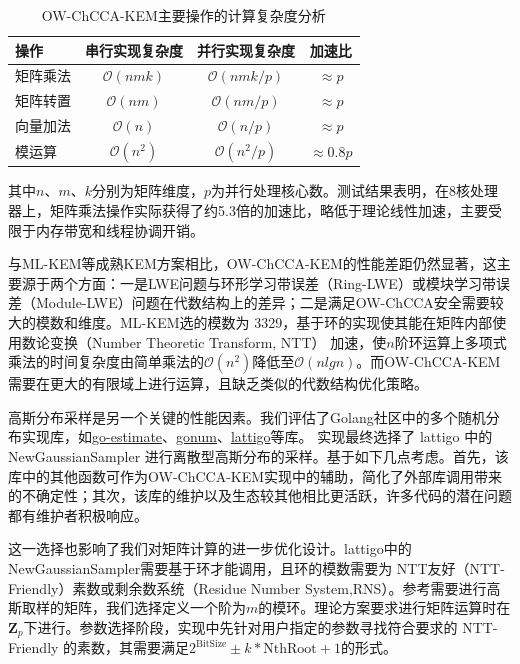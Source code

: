\begin{table}[ht]
\centering
\caption{OW-ChCCA-KEM主要操作的计算复杂度分析}
\label{tab:complexity-analysis}
\begin{tabular}{|l|c|c|c|}
\hline
\textbf{操作} & \textbf{串行实现复杂度} & \textbf{并行实现复杂度} & \textbf{加速比} \\
\hline
矩阵乘法 & $\mathcal{O}(nmk)$ & $\mathcal{O}(nmk/p)$ & $\approx p$ \\
\hline
矩阵转置 & $\mathcal{O}(nm)$ & $\mathcal{O}(nm/p)$ & $\approx p$ \\
\hline
向量加法 & $\mathcal{O}(n)$ & $\mathcal{O}(n/p)$ & $\approx p$ \\
\hline
模运算 & $\mathcal{O}(n^2)$ & $\mathcal{O}(n^2/p)$ & $\approx 0.8p$ \\
\hline
\end{tabular}
\end{table}

其中$n$、$m$、$k$分别为矩阵维度，$p$为并行处理核心数。测试结果表明，在8核处理器上，矩阵乘法操作实际获得了约5.3倍的加速比，略低于理论线性加速，主要受限于内存带宽和线程协调开销。

与ML-KEM等成熟KEM方案相比，OW-ChCCA-KEM的性能差距仍然显著，这主要源于两个方面：一是LWE问题与环形学习带误差（Ring-LWE）或模块学习带误差（Module-LWE）问题在代数结构上的差异；二是满足OW-ChCCA安全需要较大的模数和维度。ML-KEM选的模数为 3329，基于环的实现使其能在矩阵内部使用数论变换（Number Theoretic Transform, NTT） 加速，使$n$阶环运算上多项式乘法的时间复杂度由简单乘法的$\mathcal{O}{(n^2)}$降低至$\mathcal{O}{(nlgn)}$。而OW-ChCCA-KEM需要在更大的有限域上进行运算，且缺乏类似的代数结构优化策略。

高斯分布采样是另一个关键的性能因素。我们评估了Golang社区中的多个随机分布实现库，如\href{https://github.com/milosgajdos/go-estimate}{go-estimate}、\href{https://github.com/gonum/gonum}{gonum}、\href{https://github.com/tuneinsight/lattigo}{lattigo}等库。
实现最终选择了 lattigo 中的 NewGaussianSampler 进行离散型高斯分布的采样。基于如下几点考虑。首先，该库中的其他函数可作为OW-ChCCA-KEM实现中的辅助，简化了外部库调用带来的不确定性；其次，该库的维护以及生态较其他相比更活跃，许多代码的潜在问题都有维护者积极响应。

这一选择也影响了我们对矩阵计算的进一步优化设计。lattigo中的NewGaussianSampler需要基于环才能调用，且环的模数需要为 NTT友好（NTT-Friendly）素数或剩余数系统（Residue Number System,RNS）。参考需要进行高斯取样的矩阵，我们选择定义一个阶为$m$的模环。理论方案要求进行矩阵运算时在$\mathbf{Z}_p$下进行。参数选择阶段，实现中先针对用户指定的参数寻找符合要求的 NTT-Friendly 的素数，其需要满足$2^\text{BitSize} ± k * \text{NthRoot} + 1$的形式。

